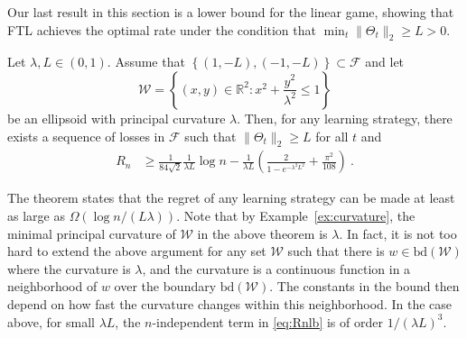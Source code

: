 \documentclass[english]{article}
\newcommand{\cW}{\mathcal{W}}
\newcommand{\cF}{\mathcal{F}}
\newcommand{\seto}[1]{\left\{#1\right\}}
\newcommand{\R}{\mathbb{R}}
\newcommand{\bd}{\mathrm{bd}}
\begin{document}

Our last result in this section is a lower bound for the linear game, showing that FTL achieves the optimal rate under the condition that  $\min_t \|\Theta_t\|_2\ge L >0$.
\begin{theorem}
	\label{thm:lowerbound}
		Let $\lambda,L \in (0,1)$. Assume that  $\seto{(1,-L), (-1, -L)} \subset \cF$ and let \[
		\cW = \seto{(x,y) \in \R^2: x^2 + \frac{y^2}{\lambda^2} \le 1}
		\]
		be
		an ellipsoid with principal curvature $\lambda$.
 		Then, for any learning strategy, there exists a sequence of losses in $\mathcal F$ such that $\|\Theta_t\|_2 \ge L$ for all $t$ and
		\begin{align}\label{eq:Rnlb}
		R_n &\ge \frac{1}{84\sqrt{2}}\frac{1}{\lambda L} \log n  - \frac{1}{\lambda L} \left(\frac{2}{1-e^{-\lambda^2L^2}} + \frac{\pi^2}{108}\right)~.
		\end{align}
\end{theorem}
The theorem states that the regret of any learning strategy can be made at least  as large as $\Omega\left(\log n/(L\lambda)\right)$.
Note that by Example~\ref{ex:curvature}, the minimal principal curvature of $\cW$ in the above theorem is $\lambda$. In fact, it is not too hard to extend the above argument for any set $\cW$ such that there is $w \in \bd(\cW)$ where the curvature is $\lambda$, and the curvature is a continuous function in a neighborhood of $w$ over the boundary $\bd(\cW)$. The constants in the bound then depend on how fast the curvature changes within this neighborhood. In the case above, for small $\lambda L$, the $n$-independent term in \eqref{eq:Rnlb} is of order $1/(\lambda L)^3$.
\end{document}
